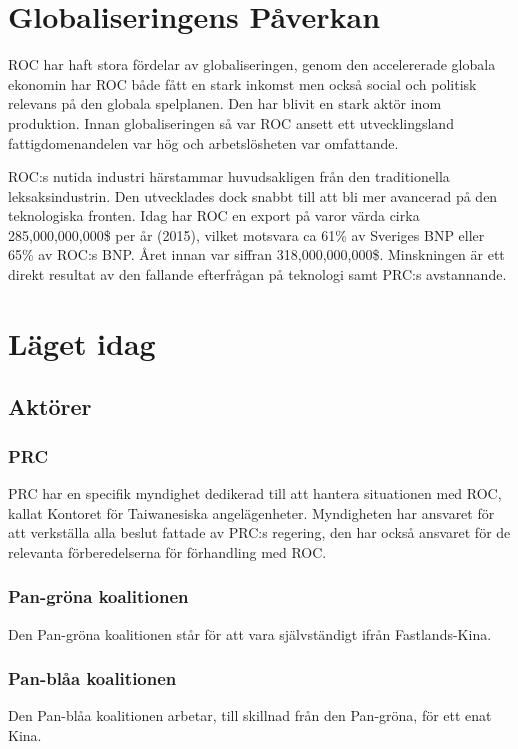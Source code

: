 \documentclass[a4paper,10pt]{article}
\begin{document}
\section*{Globaliseringens Påverkan}
ROC har haft stora fördelar av globaliseringen, genom den accelererade globala ekonomin har ROC både fått en stark inkomst men också social och politisk relevans på den globala spelplanen. Den har blivit en stark aktör inom produktion. Innan globaliseringen så var ROC ansett ett utvecklingsland fattigdomenandelen var hög och arbetslösheten var omfattande. 

ROC:s nutida industri härstammar huvudsakligen från den traditionella leksaksindustrin. Den utvecklades dock snabbt till att bli mer avancerad på den teknologiska fronten. Idag har ROC en export på varor värda cirka 285,000,000,000\$ per år (2015), vilket motsvara ca 61\% av Sveriges BNP eller 65\% av ROC:s BNP. Året innan var siffran 318,000,000,000\$. Minskningen är ett direkt resultat av den fallande efterfrågan på teknologi samt PRC:s avstannande.  

\section*{Läget idag}


\subsection*{Aktörer}

\subsubsection*{PRC}
PRC har en specifik myndighet dedikerad till att hantera situationen med ROC, kallat Kontoret för Taiwanesiska angelägenheter. Myndigheten har ansvaret för att verkställa alla beslut fattade av PRC:s regering, den har också ansvaret för de relevanta förberedelserna för förhandling med ROC.

\subsubsection*{Pan-gröna koalitionen}
Den Pan-gröna koalitionen står för att vara självständigt ifrån Fastlands-Kina.

\subsubsection*{Pan-blåa koalitionen}
Den Pan-blåa koalitionen arbetar, till skillnad från den Pan-gröna, för ett enat Kina.
\end{document}
